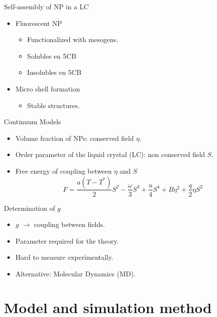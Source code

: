 \documentclass{beamer}
\begin{document}
\begin{frame}{Self-assembly of NP in a LC}
    \begin{itemize}
        \item Fluorescent NP
        \begin{itemize}
            \item Functionalized with mesogens.
            \item Solubles en 5CB
            \item Insolubles en 5CB
        \end{itemize}
        \item Micro shell formation
        \begin{itemize}
            \item Stable structures.
        \end{itemize}
    \end{itemize}
\end{frame}

\begin{frame}{Continuum Models}
    \begin{itemize}
        \item Volume fraction of NPs: conserved field $\eta$.
        \item Order parameter of the liquid crystal (LC): non conserved field $S$.
        \item Free energy of coupling between $\eta$ and $S$
        \begin{equation}
            F = \frac{a(T-T^*)}{2}S^2 - \frac{\omega}{3}S^3 + \frac{u}{4}S^4 + B\eta^2 + \frac{q}{2}\eta S^2
        \end{equation}
    \end{itemize}
\end{frame}

\begin{frame}{Determination of $g$}
    \begin{itemize}
        \item $g$ $\rightarrow$ coupling between fields.
        \item Parameter required for the theory.
        \item Hard to measure experimentally.
        \item Alternative: Molecular Dynamics (MD).
    \end{itemize}
\end{frame}

\section{Model and simulation method}
\end{document}

